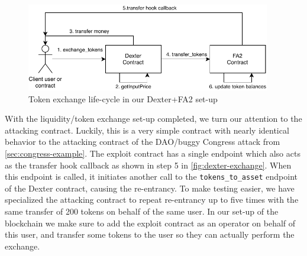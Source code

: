 \documentclass[twoside,11pt,openright]{report}
\newcommand{\coq}[1]{\texttt{#1}}
\begin{document}
\begin{figure}[h]
\begin{center}
\includegraphics[width=0.95\textwidth]{media/Dexter-exchange-diagram.pdf}
\end{center}
\caption{Token exchange life-cycle in our Dexter+FA2 set-up}
\label{fig:dexter-exchange}
\end{figure}
With the liquidity/token exchange set-up completed, we turn our attention to the attacking contract. Luckily, this is a very simple contract with nearly identical behavior to the attacking contract of the DAO/buggy Congress attack from \autoref{sec:congress-example}. The exploit contract has a single endpoint which also acts as the transfer hook callback as shown in step 5 in \autoref{fig:dexter-exchange}. When this endpoint is called, it initiates another call to the \coq{tokens\_to\_asset} endpoint of the Dexter contract, causing the re-entrancy. To make testing easier, we have specialized the attacking contract to repeat re-entrancy up to five times with the same transfer of 200 tokens on behalf of the same user. In our set-up of the blockchain we make sure to add the exploit contract as an operator on behalf of this user, and transfer some tokens to the user so they can actually perform the exchange.
\end{document}
